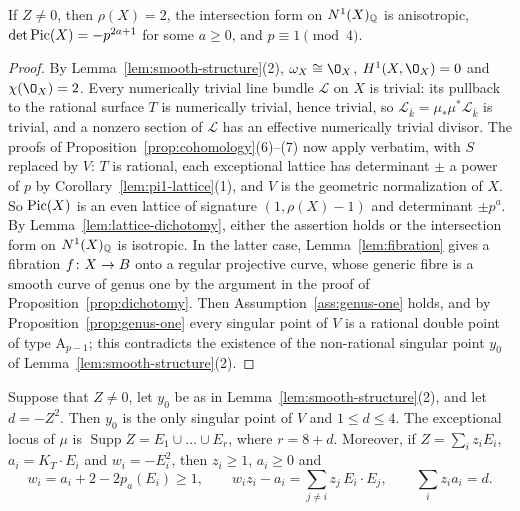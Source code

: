 \begin{proposition}\label{prop:smooth-Zpos}
If $Z\neq 0$, then $\rho(X) = 2$, the intersection form on $N^1(X)_{\mathbb{Q}}$ is anisotropic, $\det\operatorname{Pic}(X) = -p^{2a+1}$ for some $a\geq 0$, and $p\equiv 1\pmod 4$.
\end{proposition}

\begin{proof}
By Lemma~\ref{lem:smooth-structure}(2), $\omega_X\cong\O_X$, $H^1(X,\O_X) = 0$ and $\chi(\O_X) = 2$.
Every numerically trivial line bundle $\mathcal L$ on $X$ is trivial: its pullback to the rational surface $T$ is numerically trivial, hence trivial, so $\mathcal L_{\bar k} = \mu_*\mu^*\mathcal L_{\bar k}$ is trivial, and a nonzero section of $\mathcal L$ has an effective numerically trivial divisor.
The proofs of Proposition~\ref{prop:cohomology}(6)--(7) now apply verbatim, with $S$ replaced by $V$: $T$ is rational, each exceptional lattice has determinant $\pm$ a power of $p$ by Corollary~\ref{lem:pi1-lattice}(1), and $V$ is the geometric normalization of $X$.
So $\operatorname{Pic}(X)$ is an even lattice of signature $(1,\rho(X)-1)$ and determinant $\pm p^a$.
By Lemma~\ref{lem:lattice-dichotomy}, either the assertion holds or the intersection form on $N^1(X)_{\mathbb{Q}}$ is isotropic.
In the latter case, Lemma~\ref{lem:fibration} gives a fibration $f\colon X\to B$ onto a regular projective curve, whose generic fibre is a smooth curve of genus one by the argument in the proof of Proposition~\ref{prop:dichotomy}.
Then Assumption~\ref{ass:genus-one} holds, and by Proposition~\ref{prop:genus-one} every singular point of $V$ is a rational double point of type $\mathrm A_{p-1}$; this contradicts the existence of the non-rational singular point $y_0$ of Lemma~\ref{lem:smooth-structure}(2).
\end{proof}

\begin{lemma}\label{lem:smooth-numerical}
Suppose that $Z\neq 0$, let $y_0$ be as in Lemma~\ref{lem:smooth-structure}(2), and let $d = -Z^2$.
Then $y_0$ is the only singular point of $V$ and $1\leq d\leq 4$.
The exceptional locus of $\mu$ is $\operatorname{Supp}Z = E_1\cup\dots\cup E_r$, where $r = 8+d$.
Moreover, if $Z = \sum_iz_iE_i$, $a_i = K_T\cdot E_i$ and $w_i = -E_i^2$, then $z_i\geq 1$, $a_i\geq 0$ and
\[
  w_i = a_i+2-2p_a(E_i)\geq 1,\qquad
  w_iz_i-a_i = \sum_{j\neq i}z_j\,E_i\cdot E_j,\qquad
  \sum_iz_ia_i = d.
\]
\end{lemma}

